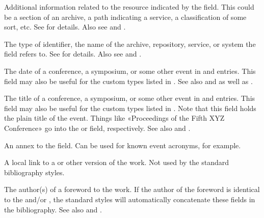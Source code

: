 \documentclass{ltxdockit}[2011/03/25]
\begin{document}
\begin{fieldlist}

Additional information related to the resource indicated by the  field. This could be a section of an archive, a path indicating a service, a classification of some sort, etc. See  for details. Also see  and .


The type of  identifier, \eg the name of the archive, repository, service, or system the  field refers to. See  for details. Also see  and .


The date of a conference, a symposium, or some other event in  and  entries. This field may also be useful for the custom types listed in . See also  and  as well as .


The title of a conference, a symposium, or some other event in  and  entries. This field may also be useful for the custom types listed in . Note that this field holds the plain title of the event. Things like «Proceedings of the Fifth XYZ Conference» go into the  or  field, respectively. See also  and .


An annex to the  field. Can be used for known event acronyms, for example.


A local link to a  or other version of the work. Not used by the standard bibliography styles.


The author(s) of a foreword to the work. If the author of the foreword is identical to the  and\slash or , the standard styles will automatically concatenate these fields in the bibliography. See also  and .



\end{fieldlist}
\end{document}
